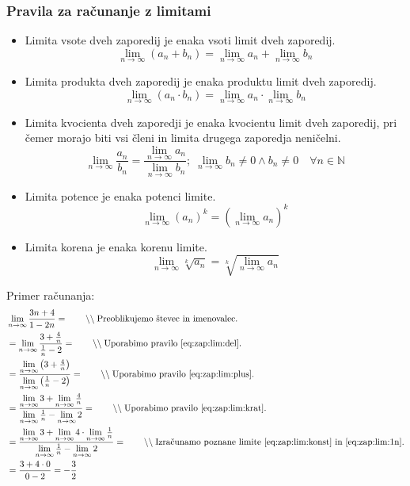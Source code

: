 \documentclass[a4paper,oneside,12pt,fleqn]{article}
\def\N{\ensuremath{\mathbb N}}
\newcommand\krat\cdot
\newcommand{\comment}[1]{\ensuremath{\qquad\backslash\backslash\;}\textnormal{#1}}
\def\limi{\displaystyle\lim_{n\to\infty}} %
\numberwithin{equation}{section}
\begin{document}
\subsubsection{Pravila za računanje z limitami}
\label{sec:zap:lim:rac}
\begin{itemize}
  \item Limita vsote dveh zaporedij je enaka vsoti limit dveh zaporedij.
    \begin{equation}
      \limi(a_n + b_n) = \limi a_n + \limi b_n \label{eq:zap:lim:plus}
    \end{equation}
  \item Limita produkta dveh zaporedij je enaka produktu limit dveh zaporedij.
    \begin{equation}
      \limi(a_n\krat b_n) = \limi a_n \krat \limi b_n \label{eq:zap:lim:krat}
    \end{equation}
  \item Limita kvocienta dveh zaporedji je enaka kvocientu limit dveh zaporedij, pri čemer
    morajo biti vsi členi in limita drugega zaporedja neničelni.
    \begin{equation}
      \limi\frac{a_n}{b_n} = \frac{\limi a_n}{\limi b_n}; \; \limi b_n \neq 0 \land b_n
      \neq 0 \quad \forall n \in \N \label{eq:zap:lim:del}
    \end{equation}
  \item Limita potence je enaka potenci limite.
    \begin{equation}
      \limi (a_n)^k = (\limi a_n)^k \label{eq:zap:lim:pot}
    \end{equation}
  \item Limita korena je enaka korenu limite.
    \begin{equation}
      \limi \sqrt[k]{a_n} = \sqrt[k]{\limi a_n} \label{eq:zap:lim:kor}
    \end{equation}
\end{itemize}

Primer računanja:
\begin{align*}
  & \limi\frac{3n+4}{1-2n} = \comment{Preoblikujemo števec in imenovalec.} \\
  & = \limi\frac{3+\frac{4}{n}}{\frac{1}{n} - 2} = \comment{Uporabimo pravilo~\eqref{eq:zap:lim:del}.} \\
  & = \frac{\limi\left(3+\textstyle\frac{4}{n}\right)}{\limi\left(\textstyle\frac{1}{n} - 2\right)} = \comment{Uporabimo pravilo~\eqref{eq:zap:lim:plus}.} \\
  & = \frac{\limi3 + \limi\textstyle\frac{4}{n}}{\limi\textstyle\frac{1}{n} - \limi2} = \comment{Uporabimo pravilo~\eqref{eq:zap:lim:krat}.} \\
  & = \frac{\limi3 + \limi4 \krat \limi\textstyle\frac{1}{n}}{\limi\textstyle\frac{1}{n} - \limi2} =
  \comment{Izračunamo poznane limite~\eqref{eq:zap:lim:konst} in~\eqref{eq:zap:lim:1n}.} \\
  & = \frac{3 + 4 \krat 0}{0 - 2} = -\frac{3}{2} 
\end{align*}
\end{document}
